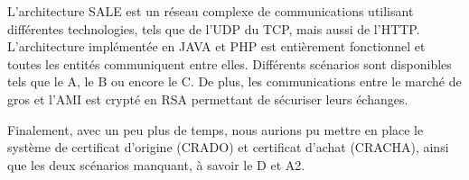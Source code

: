 L'architecture SALE est un réseau complexe de communications utilisant différentes technologies, tels que de l'UDP du TCP, mais aussi de l'HTTP. L'architecture implémentée en JAVA et PHP est entièrement fonctionnel et toutes les entités communiquent entre elles. Différents scénarios sont disponibles tels que le A, le B ou encore le C. De plus, les communications entre le marché de gros et l'AMI est crypté en RSA permettant de sécuriser leurs échanges.


Finalement, avec un peu plus de temps, nous aurions pu mettre en place le système de certificat d'origine (CRADO) et certificat d'achat (CRACHA), ainsi que les deux scénarios manquant, à savoir le D et A2.
\newpage